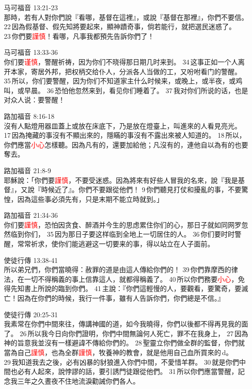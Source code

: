 马可福音 13:21-23\\
那時，若有人對你們說『看哪，基督在這裡』，或說『基督在那裡』，你們不要信。 22 因為假基督、假先知將要起來，顯神蹟奇事，倘若能行，就把選民迷惑了。 23 你們要\textcolor{red}{謹慎}！看哪，凡事我都預先告訴你們了！


马可福音 13:33-36\\
你们要\textcolor{red}{谨慎}，警醒祈祷，因为你们不晓得那日期几时来到。 34 这事正如一个人离开本家，寄居外邦，把权柄交给仆人，分派各人当做的工，又吩咐看门的警醒。 35 所以，你们要警醒，因为你们不知道家主什么时候来，或晚上，或半夜，或鸡叫，或早晨。 36 恐怕他忽然来到，看见你们睡着了。 37 我对你们所说的话，也是对众人说：要警醒！

路加福音 8:16-18\\
沒有人點燈用器皿蓋上或放在床底下，乃是放在燈臺上，叫進來的人看見亮光。 17 因為掩藏的事沒有不顯出來的，隱瞞的事沒有不露出來被人知道的。 18 所以，你們應當\textcolor{red}{小心}怎樣聽。因為凡有的，還要加給他；凡沒有的，連他自以為有的也要奪去。


路加福音 21:8-9\\
耶穌說：「你們要\textcolor{red}{謹慎}，不要受迷惑。因為將來有好些人冒我的名來，說『我是基督』，又說『時候近了』。你們不要跟從他們！ 9 你們聽見打仗和擾亂的事，不要驚惶，因為這些事必須先有，只是末期不能立時就到。」



路加福音 21:34-36\\
你们要\textcolor{red}{謹慎}，恐怕因贪食、醉酒并今生的思虑累住你们的心，那日子就如同网罗忽然临到你们， 35 因为那日子要这样临到全地上一切居住的人。 36 你们要时时警醒，常常祈求，使你们能逃避这一切要来的事，得以站立在人子面前。

使徒行傳 13:38-41\\
所以弟兄們，你們當曉得：赦罪的道是由這人傳給你們的！ 39 你們靠摩西的律法，在一切不得稱義的事上信靠這人，就都得稱義了。 40 所以你們務要\textcolor{red}{小心}，免得先知書上所說的臨到你們。 41 主說：『你們這輕慢的人，要觀看，要驚奇，要滅亡！因為在你們的時候，我行一件事，雖有人告訴你們，你們總是不信。』


使徒行傳 20:25-31\\
我素常在你們中間來往，傳講神國的道，如今我曉得，你們以後都不得再見我的面了。 26 所以我今日向你們證明，你們中間無論何人死亡，罪不在我身上， 27 因為神的旨意我並沒有一樣避諱不傳給你們的。 28 聖靈立你們做全群的監督，你們就當為自己\textcolor{red}{謹慎}，也為全群\textcolor{red}{謹慎}，牧養神的教會，就是他用自己血所買來的 d。 29 我知道我去之後，必有凶暴的豺狼進入你們中間，不愛惜羊群。 30 就是你們中間也必有人起來，說悖謬的話，要引誘門徒跟從他們。 31 所以你們應當警醒，記念我三年之久晝夜不住地流淚勸誡你們各人。


